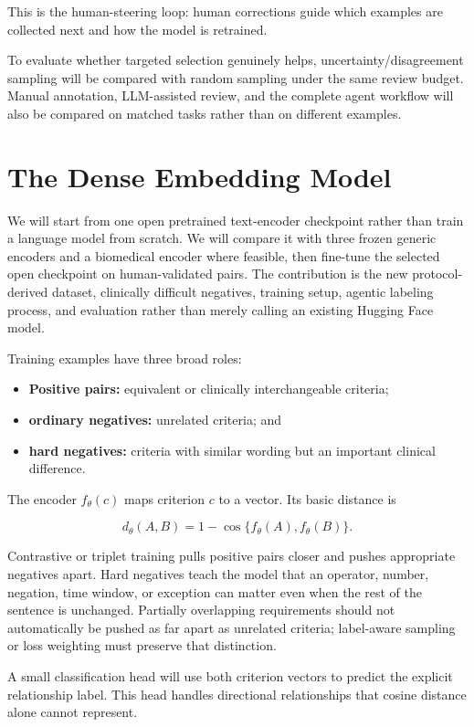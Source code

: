 \documentclass[11pt]{article}
\begin{document}
This is the human-steering loop: human corrections guide which examples are collected next and how the model is retrained.

To evaluate whether targeted selection genuinely helps, uncertainty/disagreement sampling will be compared with random sampling under the same review budget. Manual annotation, LLM-assisted review, and the complete agent workflow will also be compared on matched tasks rather than on different examples.

\section{The Dense Embedding Model}

We will start from one open pretrained text-encoder checkpoint rather than train a language model from scratch. We will compare it with three frozen generic encoders and a biomedical encoder where feasible, then fine-tune the selected open checkpoint on human-validated pairs. The contribution is the new protocol-derived dataset, clinically difficult negatives, training setup, agentic labeling process, and evaluation rather than merely calling an existing Hugging Face model.

Training examples have three broad roles:

\begin{itemize}
    \item \textbf{Positive pairs:} equivalent or clinically interchangeable criteria;
    \item \textbf{ordinary negatives:} unrelated criteria; and
    \item \textbf{hard negatives:} criteria with similar wording but an important clinical difference.
\end{itemize}

The encoder $f_\theta(c)$ maps criterion $c$ to a vector. Its basic distance is

\[
d_\theta(A,B)=1-\cos\{f_\theta(A),f_\theta(B)\}.
\]

Contrastive or triplet training pulls positive pairs closer and pushes appropriate negatives apart. Hard negatives teach the model that an operator, number, negation, time window, or exception can matter even when the rest of the sentence is unchanged. Partially overlapping requirements should not automatically be pushed as far apart as unrelated criteria; label-aware sampling or loss weighting must preserve that distinction.

A small classification head will use both criterion vectors to predict the explicit relationship label. This head handles directional relationships that cosine distance alone cannot represent.
\end{document}
